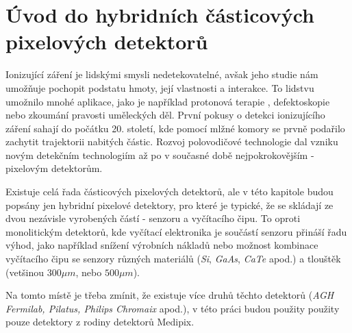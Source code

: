 

\chapter{Úvod do hybridních částicových pixelových detektorů}\label{chap:detectors}
Ionizující záření je lidskými smysli nedetekovatelné, avšak jeho studie nám umožňuje pochopit podstatu hmoty, její vlastnosti a interakce. To lidstvu umožnilo mnohé aplikace, jako je například protonová terapie \cite{tpx_app_radiotherapy}, defektoskopie nebo zkoumání pravosti uměleckých děl. První pokusy o detekci ionizujícího záření sahají do počátku 20. století, kde pomocí mlžné komory se prvně podařilo zachytit trajektorii nabitých částic. Rozvoj polovodičové technologie dal vzniku novým detekčním technologiím až po v současné době nejpokrokovějším - pixelovým detektorům.

Existuje celá řada částicových pixelových detektorů, ale v této kapitole budou popsány jen hybridní pixelové detektory, pro které je typické, že se skládají ze dvou nezávisle vyrobených částí - senzoru a vyčítacího čipu. To oproti monolitickým detektorů, kde vyčítací elektronika je součástí senzoru přináší řadu výhod, jako například snížení výrobních nákladů nebo možnost kombinace vyčítacího čipu se senzory různých materiálů (\textit{Si}, \textit{GaAs}, \textit{CaTe} apod.) a tlouštěk (vetšinou $300\mu m$, nebo $500\mu m$).

Na tomto místě je třeba zmínit, že existuje více druhů těchto detektorů (\textit{AGH Fermilab, Pilatus, Philips Chromaix} apod.)\cite{detectors_review}, v této práci budou použity použity pouze detektory z rodiny detektorů Medipix.

